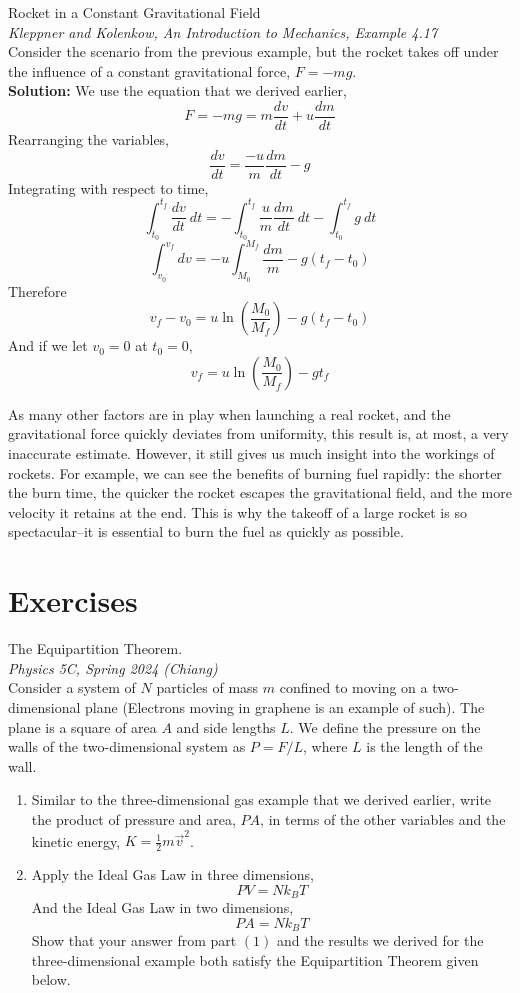 \documentclass[11pt]{article}
\theoremstyle{gangnamstyle}{\newtheorem{definition}{Definition}[]}
\theoremstyle{gangnamstyle}{\newtheorem{example}{Example}[]}
\theoremstyle{gangnamstyle}{\newtheorem{problem}{Problem}[]}
\theoremstyle{gangnamstyle}{\newtheorem{warning}{Warning}[]}
\begin{document}
\begin{example}
Rocket in a Constant Gravitational Field \\
\textit{Kleppner and Kolenkow, An Introduction to Mechanics, Example 4.17} \\
Consider the scenario from the previous example, but the rocket takes off under the influence of a constant gravitational force, $F = - mg$. \\

\textbf{Solution:} We use the equation that we derived earlier, 
\[ F = -mg = m\frac{dv}{dt} + u\frac{dm}{dt} \]
Rearranging the variables, 
\[ \frac{dv}{dt} = \frac{-u}{m} \frac{dm}{dt} - g \]
Integrating with respect to time, 
\[ \int_{t_0}^{t_f} \frac{dv}{dt} \ dt = - \int_{t_0}^{t_f} \frac{u}{m} \frac{dm}{dt} \ dt - \int_{t_0}^{t_f} g \ dt \]
\[ \int_{v_0}^{v_f} dv = -u \int_{M_0}^{M_f} \frac{dm}{m} - g(t_f - t_0) \]
Therefore
\[ v_f - v_0 = u \ln(\frac{M_0}{M_f}) - g(t_f - t_0) \]
And if we let $v_0 = 0$ at $t_0 = 0$, 
\[ v_f = u \ln(\frac{M_0}{M_f}) - gt_f \]

As many other factors are in play when launching a real rocket, and the gravitational force quickly deviates from uniformity, this result is, at most, a very inaccurate estimate. However, it still gives us much insight into the workings of rockets. For example, we can see the benefits of burning fuel rapidly: the shorter the burn time, the quicker the rocket escapes the gravitational field, and the more velocity it retains at the end. This is why the takeoff of a large rocket is so spectacular--it is essential to burn the fuel as quickly as possible.
\end{example}

\pagebreak

\section{Exercises}
\begin{problem}
The Equipartition Theorem. \\
\textit{Physics 5C, Spring 2024 (Chiang)} \\
Consider a system of $N$ particles of mass $m$ confined to moving on a two-dimensional plane (Electrons moving in graphene is an example of such). The plane is a square of area $A$ and side lengths $L$. We define the pressure on the walls of the two-dimensional system as $P = F / L$, where $L$ is the length of the wall. 
\begin{enumerate}
\item Similar to the three-dimensional gas example that we derived earlier, write the product of pressure and area, $PA$, in terms of the other variables and the kinetic energy, $K = \frac{1}{2}m\Vec{v}^2$. 
\item Apply the Ideal Gas Law in three dimensions, 
\[ PV = Nk_BT \]
And the Ideal Gas Law in two dimensions, 
\[ PA = Nk_BT \]
Show that your answer from part $(1)$ and the results we derived for the three-dimensional example both satisfy the Equipartition Theorem given below. 
\end{enumerate}
\end{problem}
\end{document}
